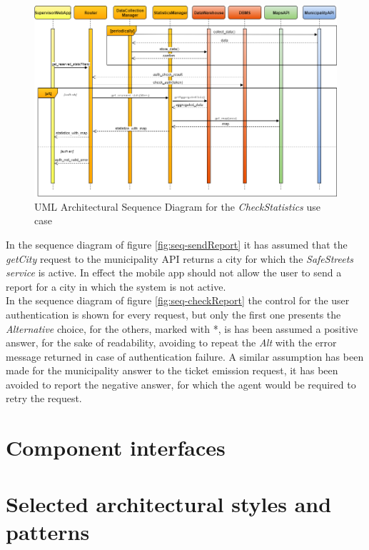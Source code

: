 \documentclass[a4paper]{report}
\begin{document}
\begin{landscape}

\begin{figure}[hp]
\includegraphics[angle=0, scale=0.70]{ArchSequenceCheckStatistics}
\caption{UML Architectural Sequence Diagram for the \textit{CheckStatistics} use case}
\label{fig:seq-checkStats}
\end{figure}

\end{landscape}
In the sequence diagram of figure \ref{fig:seq-sendReport} it has assumed that the \textit{getCity} request to the municipality API returns a city for which the \textit{SafeStreets service} is active. In effect the mobile app should not allow the user to send a report for a city in which the system is not active.\\
In the sequence diagram of figure \ref{fig:seq-checkReport} the control for the user authentication is shown for every request, but only the first one presents the \textit{Alternative} choice, for the others, marked with *, is has been assumed a positive answer, for the sake of readability, avoiding to repeat the \textit{Alt} with the error message returned in case of authentication failure. 
A similar assumption has been made for the municipality answer to the ticket emission request, it has been avoided to report the negative answer, for which the agent would be required to retry the request.

\section{Component interfaces}
\section{Selected architectural	styles and patterns}
\end{document}
